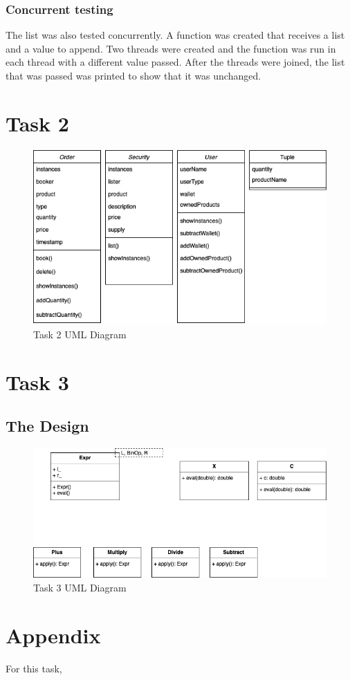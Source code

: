 \documentclass[a4paper, 12pt]{report}
\begin{document}
\subsubsection{Concurrent testing}
The list was also tested concurrently. A function was created that receives a list and a value to append. Two threads were created and the function was run in each thread with a different value passed. After the threads were joined, the list that was passed was printed to show that it was unchanged.

\section{Task 2}

\begin{figure}[H]
    \centering
    \includegraphics[width=1\textwidth]{"UML 2"}
    \caption{Task 2 UML Diagram}
\end{figure}

\section{Task 3}

\subsection{The Design}

\begin{figure}[H]
    \centering
    \includegraphics[width=1\textwidth]{"UML 3"}
    \caption{Task 3 UML Diagram}
\end{figure}
\section{Appendix}

For this task, 
\end{document}
